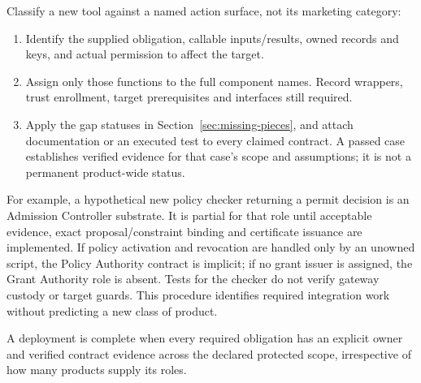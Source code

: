 Classify a new tool against a named action surface, not its marketing category:
\begin{enumerate}
\item Identify the supplied obligation, callable inputs/results, owned records and keys, and actual permission to affect the target.
\item Assign only those functions to the full component names. Record wrappers, trust enrollment, target prerequisites and interfaces still required.
\item Apply the gap statuses in Section~\ref{sec:missing-pieces}, and attach documentation or an executed test to every claimed contract. A passed case establishes verified evidence for that case's scope and assumptions; it is not a permanent product-wide status.
\end{enumerate}

For example, a hypothetical new policy checker returning a permit decision is an Admission Controller substrate. It is partial for that role until acceptable evidence, exact proposal/constraint binding and certificate issuance are implemented. If policy activation and revocation are handled only by an unowned script, the Policy Authority contract is implicit; if no grant issuer is assigned, the Grant Authority role is absent. Tests for the checker do not verify gateway custody or target guards. This procedure identifies required integration work without predicting a new class of product.

A deployment is complete when every required obligation has an explicit owner and verified contract evidence across the declared protected scope, irrespective of how many products supply its roles.
